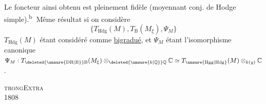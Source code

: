 Le foncteur  ainsi obtenu est pleinement fidèle (moyennant conj. de Hodge simple).\textsuperscript{\textcircled{b}} Même résultat si on considère
\[
\bigl\{T_{\mathrm{Hdg}}(M),T_{\mathrm B}(M_\xi),\Psi_M\bigr\}
\]
$T_{\mathrm{Hdg}}(M)$ étant considéré comme \uline{bigradué}, et $\Psi_M$ étant l'isomorphisme canonique $\Psi_M:T_{\deleted{\unsure{\mathrm{DR}|\mathrm B}}\mathrm B}(M_\xi)\otimes_{\deleted{\unsure{k|\mathbb Q}}\mathbb Q}\mathbb C\simeq T_{\unsure{\mathrm{Hgg}|\mathrm{Hdg}}}(M)\otimes_{k(y)}\mathbb C$.
\par\noindent\textsc{trong}\hfill\textsc{Extra}\\
 1808\hfill{}

